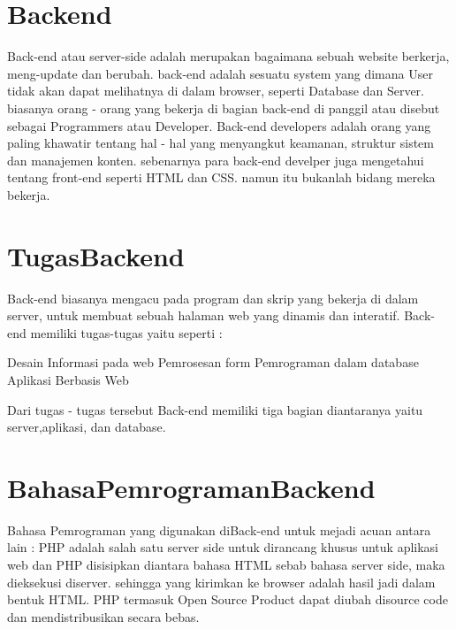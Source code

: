 \section{Backend}
Back-end atau server-side adalah merupakan bagaimana sebuah website berkerja, meng-update
dan berubah. back-end adalah sesuatu system yang dimana User tidak akan dapat melihatnya di dalam browser,
seperti Database dan Server. biasanya orang - orang yang bekerja di bagian back-end di panggil atau disebut sebagai
Programmers atau Developer. Back-end developers adalah orang yang paling khawatir tentang hal - hal yang menyangkut keamanan,
struktur sistem dan manajemen konten. sebenarnya para back-end develper juga mengetahui tentang front-end seperti HTML dan CSS.
namun itu bukanlah bidang mereka bekerja. 

\section{TugasBackend}
Back-end biasanya mengacu pada program dan skrip yang bekerja di dalam server, untuk membuat sebuah halaman web yang dinamis dan interatif. Back-end memiliki tugas-tugas yaitu seperti :

Desain Informasi pada web
Pemrosesan form
Pemrograman dalam database
Aplikasi Berbasis Web

Dari tugas - tugas tersebut Back-end memiliki tiga bagian diantaranya yaitu server,aplikasi, dan database.

\section{BahasaPemrogramanBackend}
Bahasa Pemrograman yang digunakan diBack-end untuk mejadi acuan antara lain :
PHP
 	adalah salah satu server side untuk dirancang khusus untuk aplikasi web dan PHP disisipkan diantara bahasa HTML sebab bahasa server side, maka dieksekusi diserver. sehingga yang kirimkan ke browser adalah hasil jadi dalam bentuk HTML. PHP termasuk Open Source Product dapat diubah disource code dan mendistribusikan secara bebas.






		

